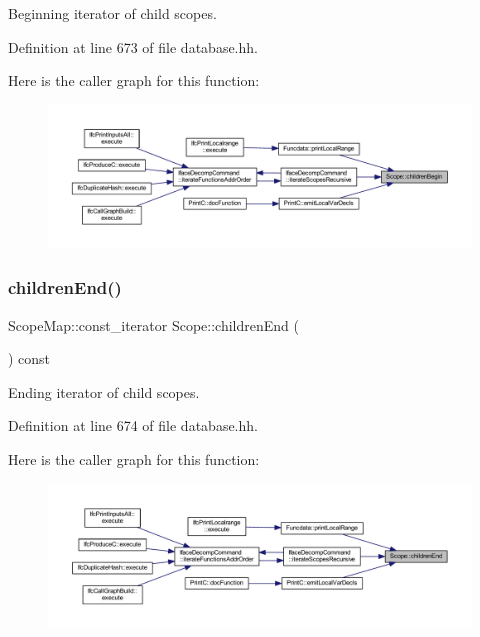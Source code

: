 Beginning iterator of child scopes. 



Definition at line 673 of file database.\+hh.

Here is the caller graph for this function\+:
\nopagebreak
\begin{figure}[H]
\begin{center}
\leavevmode
\includegraphics[width=350pt]{class_scope_ac99df3971e5fd3927fedeafc3c446346_icgraph}
\end{center}
\end{figure}
\mbox{\label{class_scope_a9e38201042b6bc4009f39d718c28297b}} 
\subsubsection{\texorpdfstring{childrenEnd()}{childrenEnd()}}
{\footnotesize\ttfamily Scope\+Map\+::const\+\_\+iterator Scope\+::children\+End (\begin{DoxyParamCaption}{ }\end{DoxyParamCaption}) const\hspace{0.3cm}{\ttfamily [inline]}}



Ending iterator of child scopes. 



Definition at line 674 of file database.\+hh.

Here is the caller graph for this function\+:
\nopagebreak
\begin{figure}[H]
\begin{center}
\leavevmode
\includegraphics[width=350pt]{class_scope_a9e38201042b6bc4009f39d718c28297b_icgraph}
\end{center}
\end{figure}
\mbox{\label{class_scope_a9bfa2b0a98ba3ceeafd5a1e7ad2e2c21}} 
